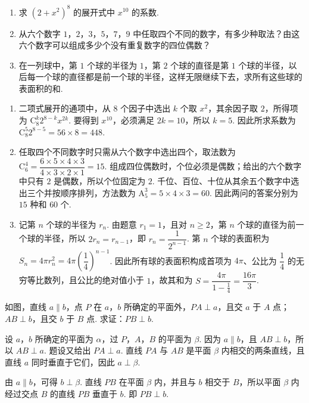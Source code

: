 \begin{problem}

\begin{enumerate}
\item 求 \(\left(2+x^2\right)^8\) 的展开式中 \(x^{10}\) 的系数.

\item 从六个数字 \(1\)，\(2\)，\(3\)，\(5\)，\(7\)，\(9\) 中任取四个不同的数字，有多少种取法？由这六个数字可以组成多少个没有重复数字的四位偶数？

\item 在一列球中，第 \(1\) 个球的半径为 \(1\)，第 \(2\) 个球的直径是第 \(1\) 个球的半径，以后每一个球的直径都是前一个球的半径，这样无限继续下去，求所有这些球的表面积的和.
\end{enumerate}

\begin{solution}
\begin{enumerate}
\item 二项式展开的通项中，从 \(8\) 个因子中选出 \(k\) 个取 \(x^2\)，其余因子取 \(2\)，所得项为 \(\mathrm C_8^k2^{8-k}x^{2k}\). 要得到 \(x^{10}\)，必须满足 \(2k=10\)，所以 \(k=5\). 因此所求系数为 \(\mathrm C_8^5 2^{8-5}=56\times8=448\).
\item 任取四个不同数字时只需从六个数字中选出四个，取法数为 \(\mathrm C_6^4=\dfrac{6\times5\times4\times3}{4\times3\times2\times1}=15\). 组成四位偶数时，个位必须是偶数；给出的六个数字中只有 \(2\) 是偶数，所以个位固定为 \(2\). 千位、百位、十位从其余五个数字中选出三个并按顺序排列，方法数为 \(\mathrm A_5^3=5\times4\times3=60\). 因此两问的答案分别为 \(15\) 种和 \(60\) 个.
\item 记第 \(n\) 个球的半径为 \(r_n\). 由题意 \(r_1=1\)，且对 \(n\geqslant2\)，第 \(n\) 个球的直径为前一个球的半径，所以 \(2r_n=r_{n-1}\)，即 \(r_n=\dfrac{1}{2^{n-1}}\). 第 \(n\) 个球的表面积为 \(S_n=4\pi r_n^2=4\pi\left(\dfrac14\right)^{n-1}\). 因此所有球的表面积构成首项为 \(4\pi\)、公比为 \(\dfrac14\) 的无穷等比数列，且公比的绝对值小于 \(1\)，故其和为 \(S=\dfrac{4\pi}{1-\frac14}=\dfrac{16\pi}{3}\).
\end{enumerate}
\end{solution}
\end{problem}

\begin{problem}

如图，直线 \(a\parallel b\)，点 \(P\) 在 \(a\)，\(b\) 所确定的平面外，\(PA\perp a\)，且交 \(a\) 于 \(A\) 点；\(AB\perp b\)，且交 \(b\) 于 \(B\) 点. 求证：\(PB\perp b\).

\begin{solution}
设 \(a\)，\(b\) 所确定的平面为 \(\alpha\)，过 \(P\)，\(A\)，\(B\) 的平面为 \(\beta\). 因为 \(a\parallel b\)，且 \(AB\perp b\)，所以 \(AB\perp a\). 题设又给出 \(PA\perp a\). 直线 \(PA\) 与 \(AB\) 是平面 \(\beta\) 内相交的两条直线，且直线 \(a\) 同时垂直于它们，因此 \(a\perp\beta\).

由 \(a\parallel b\)，可得 \(b\perp\beta\). 直线 \(PB\) 在平面 \(\beta\) 内，并且与 \(b\) 相交于 \(B\)，所以平面 \(\beta\) 内经过交点 \(B\) 的直线 \(PB\) 垂直于 \(b\). 即 \(PB\perp b\).
\end{solution}
\end{problem}

